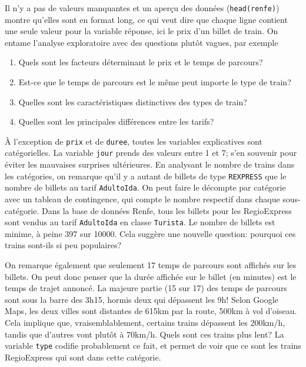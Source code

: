 \documentclass[
  11pt,
  letterpaper,
]{scrbook}
\providecommand{\tightlist}{%
  \setlength{\itemsep}{0pt}\setlength{\parskip}{0pt}}\usepackage{longtable,booktabs,array}
\theoremstyle{definition}
\theoremstyle{remark}
\begin{document}
Il n'y a pas de valeurs manquantes et un aperçu des données
(\texttt{head(renfe)}) montre qu'elles sont en format long, ce qui veut
dire que chaque ligne contient une seule valeur pour la variable
réponse, ici le prix d'un billet de train. On entame l'analyse
exploratoire avec des questions plutôt vagues, par exemple

\begin{enumerate}
\def\labelenumi{\arabic{enumi}.}
\tightlist
\item
  Quels sont les facteurs déterminant le prix et le temps de parcours?
\item
  Est-ce que le temps de parcours est le même peut importe le type de
  train?
\item
  Quelles sont les caractéristiques distinctives des types de train?
\item
  Quelles sont les principales différences entre les tarifs?
\end{enumerate}

À l'exception de \texttt{prix} et de \texttt{duree}, toutes les
variables explicatives sont catégorielles. La variable \texttt{jour}
prends des valeurs entre 1 et 7; s'en souvenir pour éviter les mauvaises
surprises ultérieures. En analysant le nombre de trains dans les
catégories, on remarque qu'il y a autant de billets de type
\texttt{REXPRESS} que le nombre de billets au tarif \texttt{AdultoIda}.
On peut faire le décompte par catégorie avec un tableau de contingence,
qui compte le nombre respectif dans chaque sous-catégorie. Dans la base
de données Renfe, tous les billets pour les RegioExpress sont vendus au
tarif \texttt{AdultoIda} en classe \texttt{Turista}. Le nombre de
billets est minime, à peine 397 sur 10000. Cela suggère une nouvelle
question: pourquoi ces trains sont-ils si peu populaires?

On remarque également que seulement 17 temps de parcours sont affichés
sur les billets. On peut donc penser que la durée affichée sur le billet
(en minutes) est le temps de trajet annoncé. La majeure partie (15 sur
17) des temps de parcours sont sous la barre des 3h15, hormis deux qui
dépassent les 9h! Selon Google Maps, les deux villes sont distantes de
615km par la route, 500km à vol d'oiseau. Cela implique que,
vraisemblablement, certains trains dépassent les 200km/h, tandis que
d'autres vont plutôt à 70km/h. Quels sont ces trains plus lent? La
variable \texttt{type} codifie probablement ce fait, et permet de voir
que ce sont les trains RegioExpress qui sont dans cette catégorie.
\end{document}
